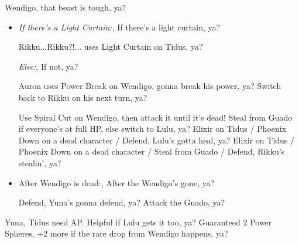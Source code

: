 \bothcb
{}
\begin{battle}[18000]{Wendigo, that beast is tough, ya?}
    \begin{itemize}
        \tidusf Haste Tidus, gotta be fast, ya?
        \tidusf Switch to Bruddahood, Gotta use the Bruddahood, ya?
        \tidusf Attack Guado B (Top One), gotta attack that Guado, ya?
        \item \textit{If there's a Light Curtain:}, If there's a light curtain, ya?
        \begin{itemize}
            \rikkuf Rikku...Rikku?!... uses Light Curtain on Tidus, ya?
        \end{itemize}
        \textit{Else:}, If not, ya?
        \begin{itemize}
            \switch{\rikku}{\auron}
            \auronf Auron uses Power Break on Wendigo, gonna break his power, ya?
            \switch{\auron}{\rikku} Switch back to Rikku on his next turn, ya?
        \end{itemize}
        \tidusf Use Spiral Cut on Wendigo, then attack it until it's dead!
        \kimahrif Steal from Guado if everyone's at full HP, else switch to Lulu, ya?
        \luluf Elixir on Tidus / Phoenix Down on a dead character / Defend, Lulu's gotta heal, ya?
        \rikkuf Elixir on Tidus / Phoenix Down on a dead character / Steal from Guado / Defend, Rikku's stealin', ya?
        \item After Wendigo is dead:, After the Wendigo's gone, ya?
        \begin{itemize}
            \yunaf Defend, Yuna's gonna defend, ya?
            \tidusf Attack the Guado, ya?
        \end{itemize}
    \end{itemize}
    Yuna, Tidus need AP. Helpful if Lulu gets it too, ya?
    Guaranteed 2 Power Spheres, +2 more if the rare drop from Wendigo happens, ya?
\end{battle}
